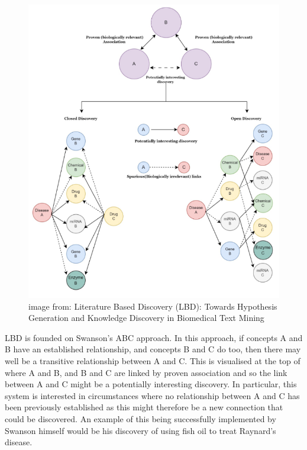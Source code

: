 \documentclass{l4proj}
\begin{document}
\begin{figure}
    \centering
    \includegraphics[width=\linewidth]{images/abc_open_closed.png}
    \caption{image from: Literature Based Discovery (LBD): Towards Hypothesis Generation and Knowledge Discovery in Biomedical Text Mining}
    \label{fig:open_closed}
\end{figure}

LBD is founded on Swanson's ABC approach. In this approach, if concepts A and B have an established relationship, and concepts B and C do too, then there may well be a transitive relationship between A and C. This is visualised at the top of  where A and B, and B and C are linked by proven association and so the link between A and C might be a potentially interesting discovery. In particular, this system is interested in circumstances where no relationship between A and C has been previously established as this might therefore be a new connection that could be discovered. An example of this being successfully implemented by Swanson himself would be his discovery of using fish oil to treat Raynard's disease. \\
\end{document}
